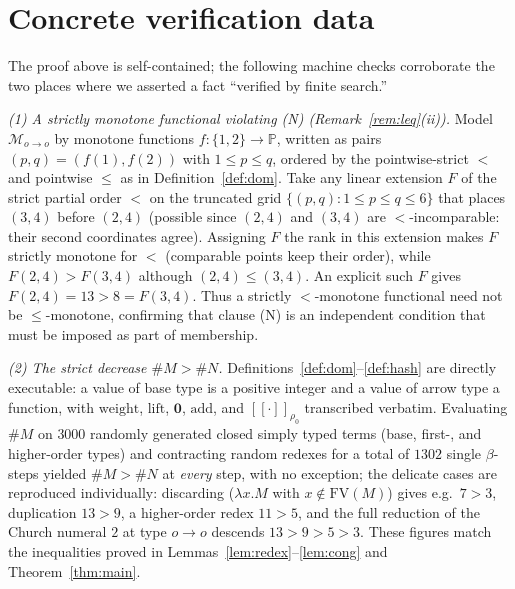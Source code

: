\documentclass{amsart}
\theoremstyle{definition}
\newcommand{\interp}[1]{[\![#1]\!]}
\newcommand{\FV}{\mathrm{FV}}
\begin{document}
\appendix
\section{Concrete verification data}\label{app:verify}

The proof above is self-contained; the following machine checks corroborate the two places
where we asserted a fact ``verified by finite search.''

\emph{(1) A strictly monotone functional violating (N) (Remark~\ref{rem:leq}(ii)).}
Model $\mathcal M_{o\to o}$ by monotone functions $f:\{1,2\}\to\mathbb P$, written as pairs
$(p,q)=(f(1),f(2))$ with $1\le p\le q$, ordered by the pointwise-strict $<$ and pointwise
$\le$ as in Definition~\ref{def:dom}. Take any linear extension $F$ of the strict partial
order $<$ on the truncated grid $\{(p,q):1\le p\le q\le 6\}$ that places $(3,4)$ before
$(2,4)$ (possible since $(2,4)$ and $(3,4)$ are $<$-incomparable: their second coordinates
agree). Assigning $F$ the rank in this extension makes $F$ strictly monotone for $<$
(comparable points keep their order), while $F(2,4)>F(3,4)$ although $(2,4)\le(3,4)$. An
explicit such $F$ gives $F(2,4)=13>8=F(3,4)$. Thus a strictly $<$-monotone functional need
not be $\le$-monotone, confirming that clause (N) is an independent condition that must be
imposed as part of membership.

\emph{(2) The strict decrease $\#M>\#N$.} Definitions~\ref{def:dom}--\ref{def:hash} are
directly executable: a value of base type is a positive integer and a value of arrow type a
function, with $\mathrm{weight}$, $\mathrm{lift}$, $\mathbf 0$, $\mathrm{add}$, and
$\interp{\cdot}_{\rho_0}$ transcribed verbatim. Evaluating $\#M$ on $3000$ randomly generated
closed simply typed terms (base, first-, and higher-order types) and contracting random
redexes for a total of $1302$ single $\beta$-steps yielded $\#M>\#N$ at \emph{every} step,
with no exception; the delicate cases are reproduced individually: discarding
($\lambda x.M$ with $x\notin\FV(M)$) gives e.g.\ $7>3$, duplication $13>9$, a higher-order
redex $11>5$, and the full reduction of the Church numeral $2$ at type $o\to o$ descends
$13>9>5>3$. These figures match the inequalities proved in
Lemmas~\ref{lem:redex}--\ref{lem:cong} and Theorem~\ref{thm:main}.
\end{document}

